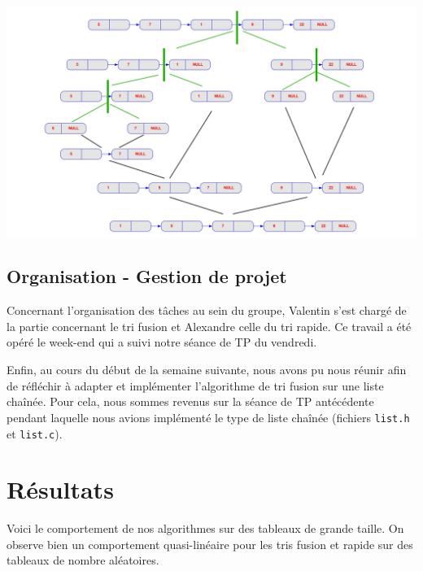 \documentclass[11pt]{article}
\begin{document}
\begin{center}
\includegraphics[scale=0.25]{images/1.jpg}
\end{center}

\subsection{Organisation - Gestion de projet}

Concernant l'organisation des tâches au sein du groupe, Valentin s'est chargé de la partie concernant le tri fusion et Alexandre celle du tri rapide. Ce travail a été opéré le week-end qui a suivi notre séance de TP du vendredi.

Enfin, au cours du début de la semaine suivante, nous avons pu nous réunir afin de réfléchir à adapter et implémenter l'algorithme de tri fusion sur une liste chaînée. Pour cela, nous sommes revenus sur la séance de TP antécédente pendant laquelle nous avions implémenté le type de liste chaînée (fichiers \texttt{list.h} et \texttt{list.c}).


\section{Résultats}
Voici le comportement de nos algorithmes sur des tableaux de grande taille.
On observe bien un comportement quasi-linéaire pour les tris fusion et rapide sur des tableaux de nombre aléatoires.
\end{document}
